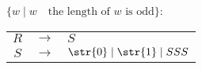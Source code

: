 $\{w \mid w \quad \text{the length of $w$ is odd}\}$: \par
\begin{tabular}{ccl}
	$R$ & $\rightarrow$ & $S$ \\
	$S$ & $\rightarrow$ & $\str{0} \mid \str{1} \mid SSS$ \\
\end{tabular}